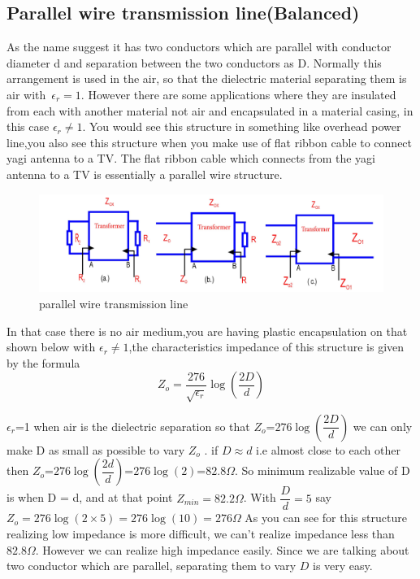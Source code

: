 \subsection{Parallel wire transmission line(Balanced)} 
As the name suggest it has two conductors which are parallel with conductor diameter d and separation between the two conductors as D. Normally this arrangement is used in the air, so that the dielectric material separating them is air with\ $\epsilon_r=1$. However  there are some applications where they are insulated from each with another material not air and encapsulated in a material casing, in this case $\epsilon_r\neq1$. You would see this structure in something like overhead power line,you also see this structure when you make use of flat ribbon cable to connect yagi antenna to a TV. The flat ribbon cable which connects from the yagi antenna to a TV is essentially a parallel wire structure.
\begin{figure}[h]
\centering
\includegraphics[width=1\linewidth]{./graphics/FIG8}
\caption{parallel wire transmission line}
\end{figure}


In that case there is no air medium,you are having plastic encapsulation on that shown below with  $\epsilon_r\neq1$,the characteristics impedance of this structure is given by the formula 
\begin{equation*}
Z_o=\dfrac{276}{\sqrt{\epsilon_r}}\log(\dfrac{2D}{d})
\end{equation*}

$\epsilon_r$=1 when air is the dielectric separation so that $Z_o$=$276\log(\dfrac{2D}{d})$ we can only make D as small as possible to vary $Z_o$ . if $D\approx d$ i.e almost close to each other then $Z_o$=$276\log(\dfrac{2d}{d})$=$276\log(2)$=$82.8\Omega$. So minimum realizable value of D is when D = d, and at that point $Z_{min}=82.2\Omega$. With $\dfrac{D}{d}=5$ say $Z_o=276\log(2\times5)=276\log(10)=276\Omega$ As you can see for this structure realizing low impedance is more difficult, we can't realize impedance less than $82.8\Omega$. However we can realize high impedance easily. Since we are talking about two conductor which are parallel, separating them to vary $D$ is very easy.

